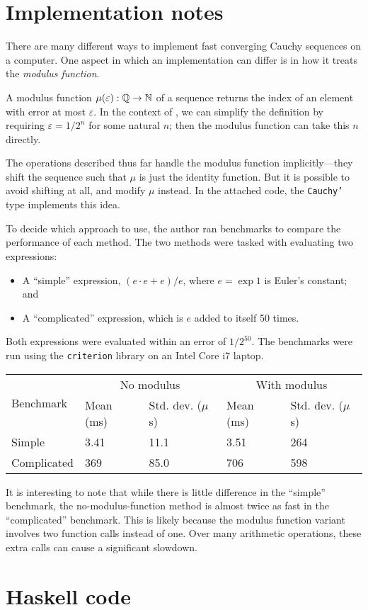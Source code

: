 \documentclass[leqno]{report}
\begin{document}
\chapter{Implementation notes}

There are many different ways to implement fast converging Cauchy sequences on a computer. One aspect in which an implementation can differ is in how it treats the \textit{modulus function}.

A modulus function $\mu(\varepsilon) : \mathbb{Q} \rightarrow \mathbb{N}$ of a sequence returns the index of an element with error at most $\varepsilon$. In the context of \FCCS, we can simplify the definition by requiring $\varepsilon = 1/2^n$ for some natural $n$; then the modulus function can take this $n$ directly.

The \FCCS{} operations described thus far handle the modulus function implicitly---they shift the sequence such that $\mu$ is just the identity function. But it is possible to avoid shifting at all, and modify $\mu$ instead. In the attached code, the \texttt{Cauchy'} type implements this idea.

To decide which approach to use, the author ran benchmarks to compare the performance of each method. The two methods were tasked with evaluating two expressions:
\begin{itemize}
    \item A ``simple'' expression, $(e \cdot e + e) / e$, where $e = \exp 1$ is Euler's constant; and
    \item A ``complicated'' expression, which is $e$ added to itself 50 times.
\end{itemize}

Both expressions were evaluated within an error of $1/2^{50}$. The benchmarks were run using the \texttt{criterion} library on an Intel Core i7 laptop.

\begin{tabular}{lllll}
    \toprule
    \multirow{2}{*}{Benchmark} &
    \multicolumn{2}{c}{No modulus} &
    \multicolumn{2}{c}{With modulus} \\
    \cmidrule(l){2-5}
    & Mean (ms) & Std. dev. ($\mu$s) & Mean (ms) & Std. dev. ($\mu$s) \\
    \midrule
    Simple & 3.41 & 11.1 & 3.51 & 264 \\
    Complicated & 369 & 85.0 & 706 & 598 \\
    \bottomrule
\end{tabular}

It is interesting to note that while there is little difference in the ``simple'' benchmark, the no-modulus-function method is almost twice as fast in the ``complicated'' benchmark. This is likely because the modulus function variant involves two function calls instead of one. Over many arithmetic operations, these extra calls can cause a significant slowdown.

\appendix
\chapter{Haskell code}

\inputminted[linenos,breaklines,mathescape]{haskell}{../Cauchy.hs}



\end{document}

